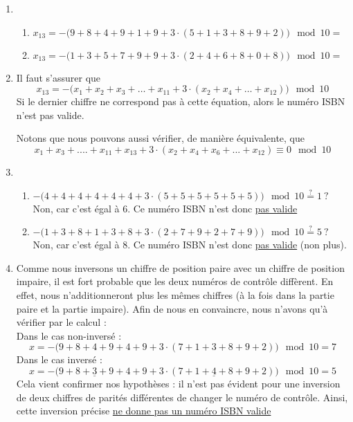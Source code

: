 \documentclass[10p,a4paper]{scrartcl}
\begin{document}
\begin{enumerate}
	\item 	\begin{enumerate}[label=(\alph*)]
				\item $x_{13} = -\big(9+8+4+9+1+9+3\cdot(5+1+3+8+9+2)\big)\mod 10 =$ 
				\item $x_{13} = -\big(1+3+5+7+9+9+3\cdot(2+4+6+8+0+8)\big) \mod 10 =$ 
			\end{enumerate}

	\item 	Il faut s'assurer que 
			\begin{equation*}
				x_{13} = -\Big(x_1 + x_2 + x_3 + \ldots + x_{11} + 3\cdot(x_2 + x_4 + \ldots + x_{12})\Big) \mod 10
			\end{equation*}			
			Si le dernier chiffre ne correspond pas à cette équation, alors le numéro ISBN n'est pas valide.
			
			Notons que nous pouvons aussi vérifier, de manière équivalente, que
			\begin{equation*}
				x_1 + x_3 + .... + x_{11} + x_{13} + 3\cdot(x_2+x_4+x_6+...+x_{12}) \equiv 0 \mod 10
			\end{equation*}
		
	\item 	\begin{enumerate}[label=(\alph*)]
				\item $-\big(4+4+4+4+4+4+3\cdot(5+5+5+5+5+5)\big) \mod 10 \overset{?}{=} 1\ ?$ Non, car c'est égal à 6. Ce numéro ISBN n'est donc \underline{pas valide}
				\item $-\big(1+3+8+1+3+8+3\cdot(2+7+9+2+7+9)\big) \mod 10 \overset{?}{=} 5\ ?$ Non, car c'est égal à 8. Ce numéro ISBN n'est donc \underline{pas valide} (non plus).
			\end{enumerate}
			
	\item 	Comme nous inversons un chiffre de position paire avec un chiffre de position impaire, il est fort probable que les deux numéros de contrôle diffèrent. En effet, nous n'additionneront plus les mêmes chiffres (à la fois dans la partie paire et la partie impaire). Afin de nous en convaincre, nous n'avons qu'à vérifier par le calcul :\\
			Dans le cas non-inversé : 
			\begin{equation*}
				x = -\big(9+8+4+9+4+9+3\cdot(7+1+3+8+9+2)\big)\mod 10 = 7
			\end{equation*}			
			Dans le cas inversé :
			\begin{equation*}
				x = -\big(9+8+\underline{3}+9+4+9+3\cdot(7+1+\underline{4}+8+9+2)\big)\mod 10 = 5
			\end{equation*}
			Cela vient confirmer nos hypothèses : il n'est pas évident pour une inversion de deux chiffres de parités différentes de changer le numéro de contrôle. Ainsi, cette inversion précise \uline{ne donne pas un numéro ISBN valide}
			

\end{enumerate}
\end{document}
